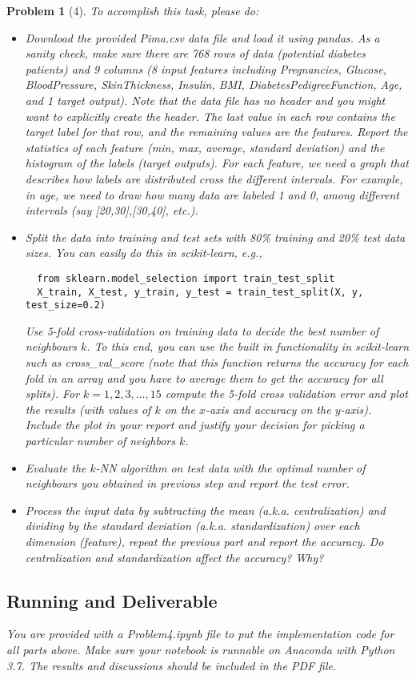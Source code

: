 \documentclass[11pt]{article}
\theoremstyle{quest}
\newtheorem*{problem}{Problem}
\begin{document}
\begin{problem}[4]
To accomplish this task, please do:
\begin{itemize}
  \item Download the provided \textsf{Pima.csv} data file and load it using \textsf{pandas}. As a sanity check, make sure there are 768 rows of data (potential diabetes patients) and 9 columns (8 input features including Pregnancies, Glucose, BloodPressure, SkinThickness, Insulin, BMI, DiabetesPedigreeFunction, Age, and 1 target output). Note that the data file has no header and you might want to explicitly create the header. The last value in each row contains the target label for that row, and the remaining values are the features. Report the statistics of each feature (min, max, average, standard deviation) and the histogram of the labels (target outputs). For each feature, we need a graph that describes how labels are distributed cross the different intervals. For example, in age, we need to draw how many data are labeled 1 and 0, among different intervals (say [20,30],[30,40], etc.).
  \item Split the data into training and test sets with 80\% training and 20\% test data sizes. You can easily do this in \textsf{scikit-learn}, e.g.,
  \begin{verbatim}
  from sklearn.model_selection import train_test_split
  X_train, X_test, y_train, y_test = train_test_split(X, y, test_size=0.2)
  \end{verbatim}
  Use 5-fold cross-validation on training data to decide the best number of neighbours $k$. To this end, you can use the built in functionality in \textsf{scikit-learn} such as \textsf{cross\_val\_score} (note that this function returns the accuracy for each fold in an array and you have to average them to get the accuracy for all splits). For $k = 1, 2, 3, \dots, 15$ compute the 5-fold cross validation error and plot the results (with values of $k$ on the $x$-axis and accuracy on the $y$-axis). Include the plot in your report and justify your decision for picking a particular number of neighbors $k$.
  \item Evaluate the $k$-NN algorithm on test data with the optimal number of neighbours you obtained in previous step and report the test error.
  \item Process the input data by subtracting the mean (a.k.a. centralization) and dividing by the standard deviation (a.k.a. standardization) over each dimension (feature), repeat the previous part and report the accuracy. Do centralization and standardization affect the accuracy? Why?
\end{itemize}

\subsection*{Running and Deliverable}
You are provided with a \textsf{Problem4.ipynb} file to put the implementation code for all parts above. Make sure your notebook is runnable on Anaconda with Python 3.7. The results and discussions should be included in the PDF file.
\end{problem}
\end{document}
